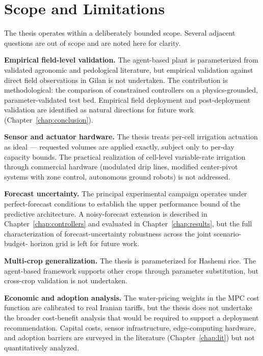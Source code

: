 \section{Scope and Limitations}
\label{sec:intro-scope}

The thesis operates within a deliberately bounded scope. Several
adjacent questions are out of scope and are noted here for clarity.

\textbf{Empirical field-level validation.} The agent-based plant is
parameterized from validated agronomic and pedological literature,
but empirical validation against direct field observations in Gilan
is not undertaken. The contribution is methodological: the comparison
of constrained controllers on a physics-grounded, parameter-validated
test bed. Empirical field deployment and post-deployment validation
are identified as natural directions for future work
(Chapter~\ref{chap:conclusion}).

\textbf{Sensor and actuator hardware.} The thesis treats per-cell
irrigation actuation as ideal --- requested volumes are applied
exactly, subject only to per-day capacity bounds. The practical
realization of cell-level variable-rate irrigation through commercial
hardware (modulated drip lines, modified center-pivot systems with
zone control, autonomous ground robots) is not addressed.

\textbf{Forecast uncertainty.} The principal experimental campaign
operates under perfect-forecast conditions to establish the upper
performance bound of the predictive architecture. A noisy-forecast
extension is described in Chapter~\ref{chap:controllers} and
evaluated in Chapter~\ref{chap:results}, but the full characterization
of forecast-uncertainty robustness across the joint scenario-budget-
horizon grid is left for future work.

\textbf{Multi-crop generalization.} The thesis is parameterized for
Hashemi rice. The agent-based framework supports other crops through
parameter substitution, but cross-crop validation is not undertaken.

\textbf{Economic and adoption analysis.} The water-pricing weights in
the MPC cost function are calibrated to real Iranian tariffs, but the
thesis does not undertake the broader cost-benefit analysis that
would be required to support a deployment recommendation.
Capital costs, sensor infrastructure, edge-computing hardware, and
adoption barriers are surveyed in the literature
(Chapter~\ref{chap:lit}) but not quantitatively analyzed.

